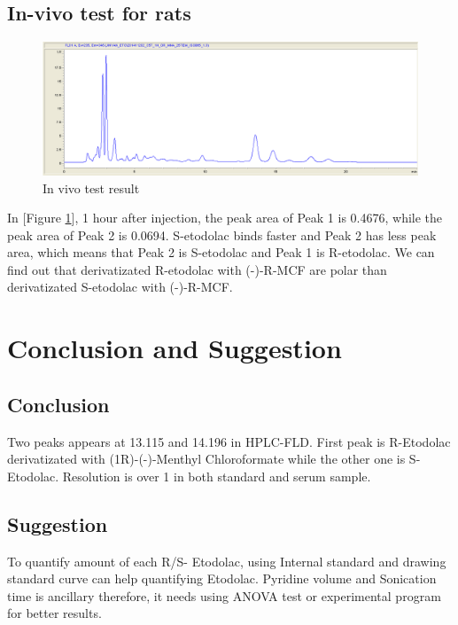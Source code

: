 \documentclass[12pt]{article} %
\begin{document}
\subsection {In-vivo test for rats}

\begin{figure}[h!]
  \centering
  \includegraphics[width=\linewidth]{f9.png}
  \caption{In vivo test result}
  \label{fig:fig8}
\end{figure}

 In [Figure \ref{fig:fig8}],  1 hour after injection, the peak area of Peak 1 is 0.4676, while the peak area of Peak 2 is 0.0694. S-etodolac binds faster\cite{cite2} and Peak 2 has less peak area, which means that Peak 2 is S-etodolac and Peak 1 is R-etodolac. We can find out that derivatizated R-etodolac with (-)-R-MCF are polar than derivatizated S-etodolac with (-)-R-MCF.

\newpage

\section {Conclusion and Suggestion}

\subsection {Conclusion}
Two peaks appears at 13.115 and 14.196 in HPLC-FLD. First peak is R-Etodolac derivatizated with (1R)-(-)-Menthyl Chloroformate while the other one is S-Etodolac. Resolution is over 1 in both standard and serum sample. 

\subsection {Suggestion}
To quantify amount of each R/S- Etodolac, using Internal standard and drawing standard curve can help quantifying Etodolac. 
Pyridine volume and Sonication time is ancillary therefore, it needs using ANOVA test or experimental program for better results.
\end{document}
